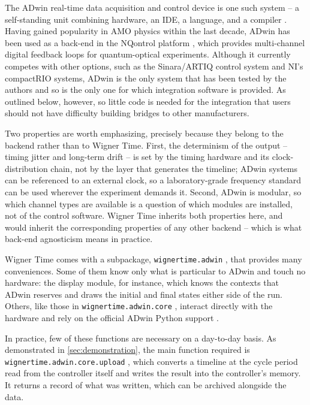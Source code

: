 \documentclass{SciPost}
\newcommand{\python}[1]{%
  \texttt{#1}%
}
\begin{document}
The ADwin real-time data acquisition and control device is one such system – a self-standing unit combining hardware, an IDE, a language, and a compiler \cite{ADwin}. Having gained popularity in AMO physics within the last decade, ADwin has been used as a back-end in the NQontrol platform \cite{darsow2020nqontrol}, which provides multi-channel digital feedback loops for quantum-optical experiments. Although it currently competes with other options, such as the Sinara/ARTIQ control system \cite{kasprowicz2020artiq,bourdeauducq2016artiq} and NI’s compactRIO systems, ADwin is the only system that has been tested by the authors and so is the only one for which integration software is provided. As outlined below, however, so little code is needed for the integration that users should not have difficulty building bridges to other manufacturers.
 
Two properties are worth emphasizing, precisely because they belong to the backend rather than to Wigner Time. First, the determinism of the output – timing jitter and long-term drift – is set by the timing hardware and its clock-distribution chain, not by the layer that generates the timeline; ADwin systems can be referenced to an external clock, so a laboratory-grade frequency standard can be used wherever the experiment demands it. Second, ADwin is modular, so which channel types are available is a question of which modules are installed, not of the control software. Wigner Time inherits both properties here, and would inherit the corresponding properties of any other backend – which is what back-end agnosticism means in practice.
 
Wigner Time comes with a subpackage, \python{wignertime.adwin}, that provides many conveniences. Some of them know only what is particular to ADwin and touch no hardware: the display module, for instance, which knows the contexts that ADwin reserves and draws the initial and final states either side of the run. Others, like those in \python{wignertime.adwin.core}, interact directly with the hardware and rely on the official ADwin Python support \cite{adwin_pypi}.
 
In practice, few of these functions are necessary on a day-to-day basis. As demonstrated in \cref{sec:demonstration}, the main function required is \python{wignertime.adwin.core.upload}, which converts a timeline at the cycle period read from the controller itself and writes the result into the controller’s memory. It returns a record of what was written, which can be archived alongside the data.
 
\end{document}
